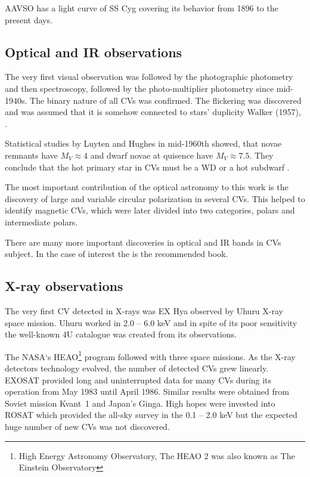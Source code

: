 \documentclass[oneside,a4paper,11pt]{report}
\begin{document}
AAVSO has a light curve of SS Cyg covering its behavior from 1896 to the present days. 

\subsection{Optical and IR observations}
The very first visual observation was followed by the photographic photometry and then spectroscopy, 
followed by the photo-multiplier photometry since mid-1940s. The binary nature of all CVs was confirmed. 
The flickering was discovered and was assumed that it is somehow connected to stars' duplicity Walker (1957),
\citet{warner:1}.

Statistical studies by Luyten and Hughes in mid-1960th showed, that novae remnants have $M_V \approx 4$ and 
dwarf novae at quisence have $M_V \approx 7.5$. They conclude that the hot primary star in CVs must be a WD or 
a hot subdwarf \citet{warner:1}.   

The most important contribution of the optical astronomy to this work is the discovery of large and 
variable circular polarization in several CVs. This helped to identify magnetic CVs, 
which were later divided into two categories, polars and intermediate polars.

There are many more important discoveries in optical and IR bands in CVs subject. In the case of interest the 
 \citet{warner:1} is the recommended book. 
   
   
\subsection{X-ray observations}
The very first CV detected in X-rays was EX Hya observed by Uhuru X-ray space mission. 
Uhuru worked in 2.0 – 6.0 keV and in spite of its poor sensitivity the well-known 4U catalogue
 was created \citet{1978ApJS...38..357F} from its observations.

The NASA`s HEAO\footnote{High Energy Astronomy Observatory, The HEAO 2 was also known as 
The Einstein Observatory} program followed with three space missions. As the X-ray detectors 
technology evolved, the number of detected CVs grew linearly. \mbox{EXOSAT} provided long and 
uninterrupted data for many CVs during its operation from May 1983 until April 1986. 
Similar results were obtained from Soviet mission \mbox{Kvant 1} and Japan's Ginga.
High hopes were invested into ROSAT which provided the all-sky survey in the
 0.1 – 2.0 keV but the expected huge number of new CVs was not discovered. 
\end{document}
